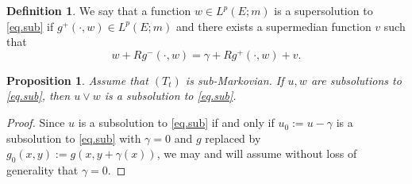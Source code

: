 \documentclass[11pt,a4paper,reqno]{amsart}
\newtheorem{proposition}[theorem]{\bf Proposition}
\theoremstyle{definition}
\newtheorem{definition}[theorem]{Definition}
\numberwithin{equation}{section}
\begin{document}
\begin{definition}
We say that a  function $w\in L^p(E;m)$ is a supersolution to
\eqref{eq.sub}
if $g^+(\cdot,w)\in L^p(E;m)$ and there exists a supermedian function $v$
such that
\[
w+Rg^-(\cdot,w)=\gamma+Rg^+(\cdot,w)+v.
\]
\end{definition}

\begin{proposition}
\label{prop.maxsub}
Assume that $(T_t)$ is sub-Markovian. If $u,w$ are  subsolutions to
 \eqref{eq.sub}, then $u\vee w$ is a subsolution to \eqref{eq.sub}.
\end{proposition}
\begin{proof}
Since $u$ is a subsolution  to \eqref{eq.sub} if and only if $u_0:=u-\gamma$
is a subsolution  to \eqref{eq.sub} with $\gamma=0$ and $g$ replaced by $g_0(x,y):=g(x,y+\gamma(x))$,
we may and will assume without loss of generality that $\gamma=0$.


\end{proof}
\end{document}
